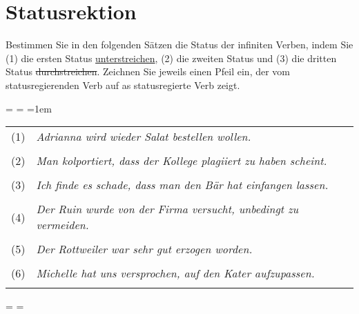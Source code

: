 \documentclass[12pt,a4paper,twoside]{article}
\newcommand*{\mybox}[1]{\framebox{#1}}
\newenvironment{spread}
{%
  \newdimen\origiwspc%
  \newdimen\origiwstr%
  \origiwspc=\fontdimen2\font%
  \origiwstr=\fontdimen3\font%
  \fontdimen2\font=1em%
  \doublespacing%
}{%
  \fontdimen2\font=\origiwspc%
  \fontdimen3\font=\origiwstr%
}
\begin{document}
\newpage

\section{Statusrektion}

Bestimmen Sie in den folgenden Sätzen die Status der infiniten Verben, indem Sie (1) die ersten Status \ul{unterstreichen}, (2) die zweiten Status \mybox{umrahmen} und (3) die dritten Status \sout{durchstreichen}.
Zeichnen Sie jeweils einen Pfeil ein, der vom statusregierenden Verb auf as statusregierte Verb zeigt.

\begin{spread}
  \begin{tabular}[h]{cl}
    (1) & \textit{Adrianna wird wieder Salat bestellen wollen.}\\
    &\\
    (2) & \textit{Man kolportiert, dass der Kollege plagiiert zu haben scheint.}\\
    &\\
    (3) & \textit{Ich finde es schade, dass man den Bär hat einfangen lassen.}\\
    &\\
    (4) & \textit{Der Ruin wurde von der Firma versucht, unbedingt zu vermeiden.}\\
    &\\
    (5) & \textit{Der Rottweiler war sehr gut erzogen worden.}\\
    &\\
    (6) & \textit{Michelle hat uns versprochen, auf den Kater aufzupassen.}\\
    &\\
  \end{tabular}
\end{spread}
\end{document}

